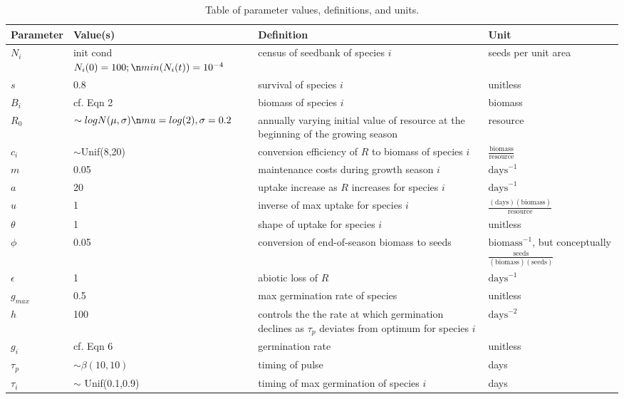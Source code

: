 \documentclass[11pt,letter]{article}
\begin{document}
\begin{center}
\begin{table}[h!]
\caption{Table of parameter values, definitions, and units.}
\begin{tabular}{ | p{2.0cm} | p{3.5cm} | p{5.0cm} | p{4.0cm} |}
\hline 
Parameter & Value(s) & Definition & Unit \\ \hline 
\(N_{i}\) & init cond $N_{i}(0) = 100; \n min(N_{i}(t)) = 10^{-4}$ & census of seedbank of species \(i\) & seeds per unit area \\ \hline
\(s\) & 0.8 & survival of species \(i\) & unitless \\ \hline
\(B_{i}\) & cf. Eqn 2 & biomass of species \(i\) & biomass \\ \hline
\(R_0\) & $\sim logN(\mu, \sigma)\n mu=log(2),\sigma = 0.2 $ & annually varying initial value of resource at the beginning of the growing season & resource\\ \hline
\(c_{i}\) & $\sim$Unif(8,20) & conversion efficiency of \(R\) to biomass of species \(i\) &  \(\frac{\text{biomass}}{\text{resource}}\) \\ \hline
\(m\) & 0.05 & maintenance costs during growth season \(i\) & \(\text{days}^{-1}\) \\ \hline
\(a\) & 20 & uptake increase as \(R\) increases for species \(i\) & \(\text{days}^{-1}\) \\ \hline
\(u\) & 1 & inverse of max uptake for species \(i\) & \(\frac{(\text{days})(\text{biomass})}{\text{resource}}\) \\ \hline
\(\theta\) & 1 & shape of uptake for species \(i\) & unitless\\ \hline
\(\phi\) & 0.05 & conversion of end-of-season biomass to seeds & \(\text{biomass}^{-1}\), but conceptually \(\frac{\text{seeds}}{(\text{biomass})(\text{seeds})}\) \\ \hline
\(\epsilon\) & 1 & abiotic loss of \(R\) &  \(\text{days}^{-1}\) \\ \hline
\(g_{max}\) & 0.5 & max germination rate of species & unitless \\ \hline
\(h\) & 100 &  controls the the rate at which germination declines as \(\tau_{p}\) deviates from optimum for species \(i\)  & \(\text{days}^{-2}\) \\ \hline
\(g_{i}\) & cf. Eqn 6 & germination rate & unitless \\ \hline
\(\tau_{p}\) & $\sim \beta(10,10)$ & timing of pulse & days \\ \hline
\(\tau_{i}\) & $\sim$ Unif(0.1,0.9) & timing of max germination of species \(i\) & days \\ \hline

\end{tabular}
\end{table}
\end{center}
\end{document}
